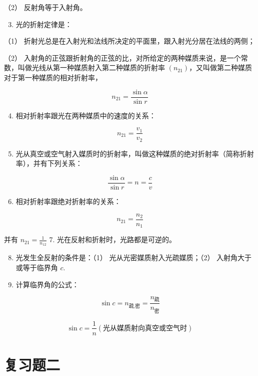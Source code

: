 （2） 反射角等于入射角。

\begin{enumerate}
\setcounter{enumi}{2}
\item
  光的折射定律是：
\end{enumerate}

（1） 折射光总是在入射光和法线所决定的平面里，跟入射光分居在法线的两侧；

（2）
入射角的正弦跟折射角的正弦的比，对所给定的两种媒质来说，是一个常数，叫做光线从第一种媒质射入第二种媒质的折射率
\((n_{21})\)，又叫做第二种媒质对于第一种媒质的相对折射率，

\[
n _ {21} = \frac {\sin \alpha}{\sin r}
\]

\begin{enumerate}
\setcounter{enumi}{3}
\item
  相对折射率跟光在两种媒质中的速度的关系：
\end{enumerate}

\[
n _ {21} = \frac {v _ {1}}{v _ {2}}
\]

\begin{enumerate}
\setcounter{enumi}{4}
\item
  光从真空或空气射入媒质时的折射率，叫做这种媒质的绝对折射率（简称折射率），并有下列关系：
\end{enumerate}

\[
\frac {\sin \alpha}{\sin r} = n = \frac {c}{v}
\]

\begin{enumerate}
\setcounter{enumi}{5}
\item
  相对折射率跟绝对折射率的关系：
\end{enumerate}

\[
n _ {21} = \frac {n _ {2}}{n _ {1}}
\]

并有 \(n_{21} = \frac{1}{n_{12}}\) 7. 光在反射和折射时，光路都是可逆的。

\begin{enumerate}
\setcounter{enumi}{7}
\item
  光发生全反射的条件是：（1） 光从光密媒质射入光疏媒质；（2）
  入射角大于或等于临界角 \(c\).
\item
  计算临界角的公式：
\end{enumerate}

\[
\sin c = n _ {\text{疏,密}} = \frac {n _ {\text{疏}}}{n _ {\text{密}}}
\]

\[
\sin c = \frac {1}{n} (\text{光从媒质射向真空或空气时})
\]

\section{复习题二}

